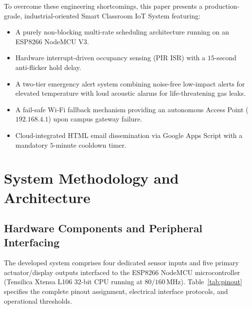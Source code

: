 \documentclass[conference]{IEEEtran}
\begin{document}
To overcome these engineering shortcomings, this paper presents a production-grade, industrial-oriented Smart Classroom IoT System featuring:
\begin{itemize}
    \item A purely non-blocking multi-rate scheduling architecture running on an ESP8266 NodeMCU V3.
    \item Hardware interrupt-driven occupancy sensing (PIR ISR) with a $15$-second anti-flicker hold delay.
    \item A two-tier emergency alert system combining noise-free low-impact alerts for elevated temperature with loud acoustic alarms for life-threatening gas leaks.
    \item A fail-safe Wi-Fi fallback mechanism providing an autonomous Access Point ($192.168.4.1$) upon campus gateway failure.
    \item Cloud-integrated HTML email dissemination via Google Apps Script with a mandatory $5$-minute cooldown timer.
\end{itemize}

\section{System Methodology and Architecture}

\subsection{Hardware Components and Peripheral Interfacing}
The developed system comprises four dedicated sensor inputs and five primary actuator/display outputs interfaced to the ESP8266 NodeMCU microcontroller (Tensilica Xtensa L106 32-bit CPU running at $80/160\,\text{MHz}$). Table~\ref{tab:pinout} specifies the complete pinout assignment, electrical interface protocols, and operational thresholds.
\end{document}
